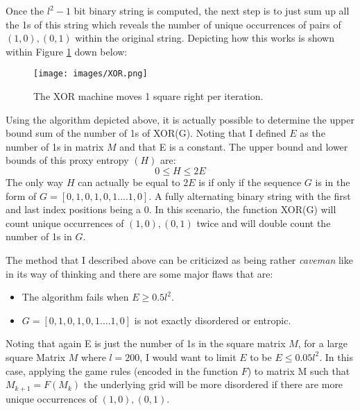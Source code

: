 \vspace{0.3cm}
Once the $l^2-1$ bit binary string is computed, the next step is to just sum up all the 1s of this string which reveals the number of unique occurrences of pairs of $(1,0), (0,1)$ within the original string. Depicting how this works is shown within Figure \ref{fig:XOR} down below: 
\begin{figure}[H]
    \centering
    \texttt{[image: images/XOR.png]}
    \caption{The XOR machine moves 1 square right per iteration.}
    \label{fig:XOR}
\end{figure}
Using the algorithm depicted above, it is actually possible to determine the upper bound sum of the number of 1s of XOR(G). Noting that I defined $E$ as the number of 1s in matrix $M$ and that E is a constant. The upper bound and lower bounds of this proxy entropy $(H)$ are: 
$$0 \le H \le 2E$$
The only way $H$ can actually be equal to $2E$ is if only if the sequence $G$ is in the form of $G=[0, 1, 0, 1, 0, 1 .... 1, 0]$. A fully alternating binary string with the first and last index positions being a 0. In this scenario, the function XOR(G) will count unique occurrences of $(1,0), (0,1)$ twice and will double count the number of 1s in $G$. \par

\vspace{0.3cm}
The method that I described above can be criticized as being rather \emph{caveman} like in its way of thinking and there are some major flaws that are: 
\begin{itemize}
    \item The algorithm fails when $E \ge 0.5 l^{2}$.
    \item $G=[0, 1, 0, 1, 0, 1 .... 1, 0]$ is not exactly disordered or entropic.
\end{itemize}
Noting that again E is just the number of 1s in the square matrix $M$, for a large square Matrix $M$ where $l=200$, I would want to limit $E$ to be $E \leq 0.05l^{2}$. In this case, applying the game rules (encoded in the function $F$) to matrix M such that $M_{k+1}=F(M_{k})$ the underlying grid will be more disordered if there are more unique occurrences of $(1,0), (0,1)$. \par
